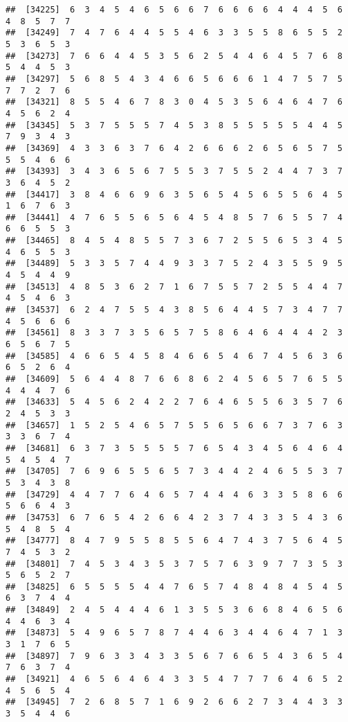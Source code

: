 \documentclass[
]{book}
\begin{document}
\begin{verbatim}
##  [34225]  6  3  4  5  4  6  5  6  6  7  6  6  6  6  4  4  4  5  6  4  8  5  7  7
##  [34249]  7  4  7  6  4  4  5  5  4  6  3  3  5  5  8  6  5  5  2  5  3  6  5  3
##  [34273]  7  6  6  4  4  5  3  5  6  2  5  4  4  6  4  5  7  6  8  5  4  4  5  3
##  [34297]  5  6  8  5  4  3  4  6  6  5  6  6  6  1  4  7  5  7  5  7  7  2  7  6
##  [34321]  8  5  5  4  6  7  8  3  0  4  5  3  5  6  4  6  4  7  6  4  5  6  2  4
##  [34345]  5  3  7  5  5  5  7  4  5  3  8  5  5  5  5  5  4  4  5  7  9  3  4  3
##  [34369]  4  3  3  6  3  7  6  4  2  6  6  6  2  6  5  6  5  7  5  5  5  4  6  6
##  [34393]  3  4  3  6  5  6  7  5  5  3  7  5  5  2  4  4  7  3  7  3  6  4  5  2
##  [34417]  3  8  4  6  6  9  6  3  5  6  5  4  5  6  5  5  6  4  5  1  6  7  6  3
##  [34441]  4  7  6  5  5  6  5  6  4  5  4  8  5  7  6  5  5  7  4  6  6  5  5  3
##  [34465]  8  4  5  4  8  5  5  7  3  6  7  2  5  5  6  5  3  4  5  4  6  5  5  3
##  [34489]  5  3  3  5  7  4  4  9  3  3  7  5  2  4  3  5  5  9  5  4  5  4  4  9
##  [34513]  4  8  5  3  6  2  7  1  6  7  5  5  7  2  5  5  4  4  7  4  5  4  6  3
##  [34537]  6  2  4  7  5  5  4  3  8  5  6  4  4  5  7  3  4  7  7  4  5  6  6  6
##  [34561]  8  3  3  7  3  5  6  5  7  5  8  6  4  6  4  4  4  2  3  6  5  6  7  5
##  [34585]  4  6  6  5  4  5  8  4  6  6  5  4  6  7  4  5  6  3  6  6  5  2  6  4
##  [34609]  5  6  4  4  8  7  6  6  8  6  2  4  5  6  5  7  6  5  5  4  4  4  7  6
##  [34633]  5  4  5  6  2  4  2  2  7  6  4  6  5  5  6  3  5  7  6  2  4  5  3  3
##  [34657]  1  5  2  5  4  6  5  7  5  5  6  5  6  6  7  3  7  6  3  3  3  6  7  4
##  [34681]  6  3  7  3  5  5  5  5  7  6  5  4  3  4  5  6  4  6  4  5  4  5  4  7
##  [34705]  7  6  9  6  5  5  6  5  7  3  4  4  2  4  6  5  5  3  7  5  3  4  3  8
##  [34729]  4  4  7  7  6  4  6  5  7  4  4  4  6  3  3  5  8  6  6  5  6  6  4  3
##  [34753]  6  7  6  5  4  2  6  6  4  2  3  7  4  3  3  5  4  3  6  5  4  8  5  4
##  [34777]  8  4  7  9  5  5  8  5  5  6  4  7  4  3  7  5  6  4  5  7  4  5  3  2
##  [34801]  7  4  5  3  4  3  5  3  7  5  7  6  3  9  7  7  3  5  3  5  6  5  2  7
##  [34825]  6  5  5  5  5  4  4  7  6  5  7  4  8  4  8  4  5  4  5  6  3  7  4  4
##  [34849]  2  4  5  4  4  4  6  1  3  5  5  3  6  6  8  4  6  5  6  4  4  6  3  4
##  [34873]  5  4  9  6  5  7  8  7  4  4  6  3  4  4  6  4  7  1  3  3  1  7  6  5
##  [34897]  7  9  6  3  3  4  3  3  5  6  7  6  6  5  4  3  6  5  4  7  6  3  7  4
##  [34921]  4  6  5  6  4  6  4  3  3  5  4  7  7  7  6  4  6  5  2  4  5  6  5  4
##  [34945]  7  2  6  8  5  7  1  6  9  2  6  6  2  7  3  4  4  3  3  3  5  4  4  6

\end{verbatim}
\end{document}
